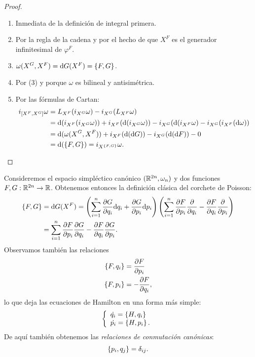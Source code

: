 \begin{proof}\leavevmode
  \begin{enumerate}
    \item Inmediata de la definición de integral primera.
    \item Por la regla de la cadena y por el hecho de que $X^ F$ es el generador infinitesimal de $\varphi^F$.
    \item $\omega(X^G,X^F)=\mathrm{d} G (X^F) = \left\lbrace F,G\right\rbrace$.
    \item Por (3) y porque $\omega$ es bilineal y antisimétrica.
    \item Por las fórmulas de Cartan:
      \begin{align*}
	i_{\left[X^F,X^G\right]} \omega & =  L_{X^F}(i_{X^G}\omega) - i_{X^G}(L_{X^F} \omega) \\ 
	& = \mathrm{d} (i_{X^F}(i_{X^G}\omega)) + i_{X^F}(\mathrm{d} (i_{X^G}\omega)) - i_{X^G}(\mathrm{d}(i_{X^F}\omega) - i_{X^G}(i_{X^F}(\mathrm{d} \omega)) \\
	& = \mathrm{d} (\omega(X^G,X^F)) + i_{X^F}(\mathrm{d}(\mathrm{d} G)) - i_{X^G}(\mathrm{d} (\mathrm{d} F)) - 0 \\
	& = \mathrm{d} (\left\lbrace F,G\right\rbrace) = i_{X^{\left\lbrace F,G\right\rbrace}}\omega.
      \end{align*}
  \end{enumerate}
\end{proof}

\begin{ejemplo}
  Consideremos el espacio simpléctico canónico $(\mathbb{R}^{2n},\omega_n)$ y dos funciones $F,G:\mathbb{R}^{2n} \rightarrow \mathbb{R}$. Obtenemos entonces la definición clásica del corchete de Poisson:
  \begin{align*}
    \left\lbrace F,G\right\rbrace & = \mathrm{d} G (X^F) = \left( \sum_{i=1}^n \frac{\partial G}{\partial q_i} \mathrm{d} q_i + \frac{\partial G}{\partial p_i} \mathrm{d} p_i \right) \left( \sum_{i=1}^n \frac{\partial F}{\partial p_i} \frac{\partial}{\partial q_i} - \frac{\partial F}{\partial q_i} \frac{\partial}{\partial p_i}\right) \\ 
    & =\sum_{i=1}^n \frac{\partial F}{\partial p_i} \frac{\partial G}{\partial q_i} - \frac{\partial F}{\partial q_i} \frac{\partial G}{\partial p_i}.
  \end{align*}
  Observamos también las relaciones
  \begin{align*}
    \left\lbrace F,q_i\right\rbrace &= \frac{\partial F}{\partial p_i} \\
    \left\lbrace F,p_i\right\rbrace &= -\frac{\partial F}{\partial q_i},
  \end{align*}
  lo que deja las ecuaciones de Hamilton en una forma más simple:
  \begin{equation*}
    \left\lbrace
    \begin{array}{l}
      \dot{q_i}=\left\lbrace H,q_i\right\rbrace \\
      \dot{p_i}=\left\lbrace H,p_i\right\rbrace.
    \end{array}
    \right.
  \end{equation*}
  De aquí también obtenemos las \emph{relaciones de conmutación canónicas}:
  \begin{equation*}
    \left\lbrace p_i,q_j\right\rbrace=\delta_{ij}.
  \end{equation*}
\end{ejemplo}

